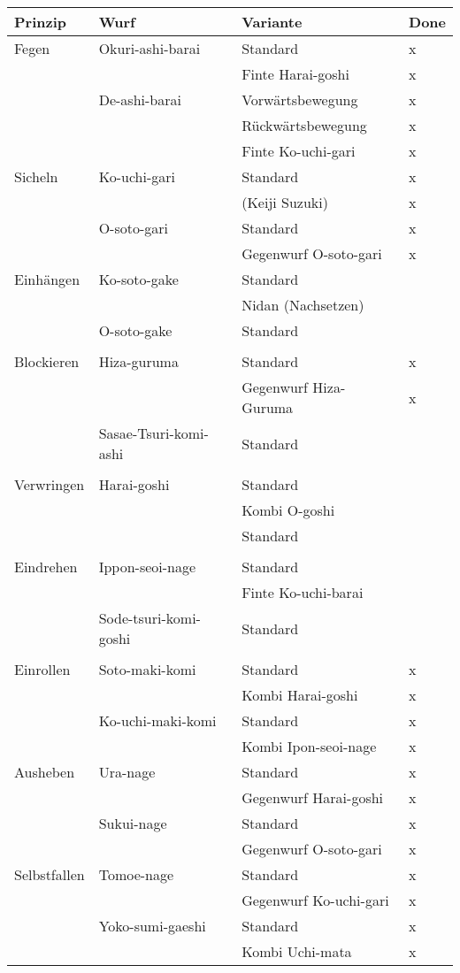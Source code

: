 \documentclass[11pt]{article}
\begin{document}
\begin{center}
\begin{tabular}{llll}
Prinzip & Wurf & Variante & Done\\
\hline
Fegen & Okuri-ashi-barai & Standard & x\\
 &  & Finte Harai-goshi & x\\
 & De-ashi-barai & Vorwärtsbewegung & x\\
 &  & Rückwärtsbewegung & x\\
 &  & Finte Ko-uchi-gari & x\\
Sicheln & Ko-uchi-gari & Standard & x\\
 &  & (Keiji Suzuki) & x\\
 & O-soto-gari & Standard & x\\
 &  & Gegenwurf O-soto-gari & x\\
Einhängen & Ko-soto-gake & Standard & \\
 &  & Nidan (Nachsetzen) & \\
 & O-soto-gake & Standard & \\
 &  &  & \\
Blockieren & Hiza-guruma & Standard & x\\
 &  & Gegenwurf Hiza-Guruma & x\\
 & Sasae-Tsuri-komi-ashi & Standard & \\
 &  &  & \\
Verwringen & Harai-goshi & Standard & \\
 &  & Kombi O-goshi & \\
 &  & Standard & \\
 &  &  & \\
Eindrehen & Ippon-seoi-nage & Standard & \\
 &  & Finte Ko-uchi-barai & \\
 & Sode-tsuri-komi-goshi & Standard & \\
 &  &  & \\
Einrollen & Soto-maki-komi & Standard & x\\
 &  & Kombi Harai-goshi & x\\
 & Ko-uchi-maki-komi & Standard & x\\
 &  & Kombi Ipon-seoi-nage & x\\
Ausheben & Ura-nage & Standard & x\\
 &  & Gegenwurf Harai-goshi & x\\
 & Sukui-nage & Standard & x\\
 &  & Gegenwurf O-soto-gari & x\\
Selbstfallen & Tomoe-nage & Standard & x\\
 &  & Gegenwurf Ko-uchi-gari & x\\
 & Yoko-sumi-gaeshi & Standard & x\\
 &  & Kombi Uchi-mata & x\\
\end{tabular}
\end{center}
\end{document}
